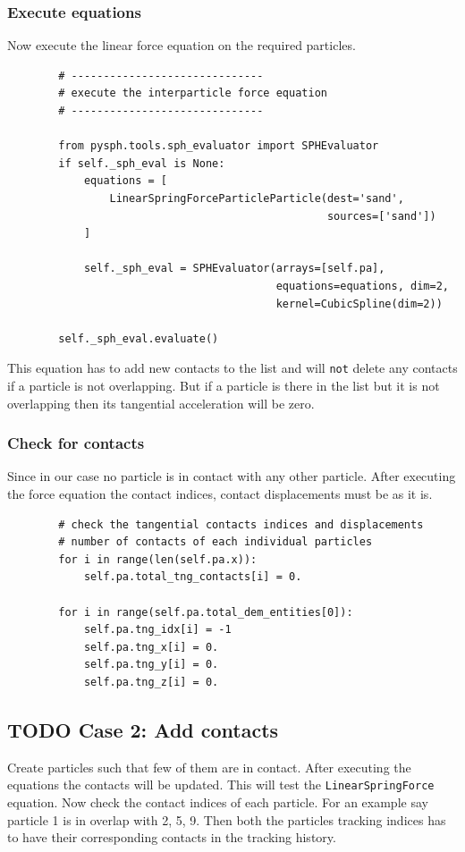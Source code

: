 \documentclass[11pt]{article}
\begin{document}
\subsubsection{Execute equations}
\label{sec:orgbbfcea2}
Now execute the linear force equation on the required particles.
\begin{verbatim}
        # ------------------------------
        # execute the interparticle force equation
        # ------------------------------

        from pysph.tools.sph_evaluator import SPHEvaluator
        if self._sph_eval is None:
            equations = [
                LinearSpringForceParticleParticle(dest='sand',
                                                  sources=['sand'])
            ]

            self._sph_eval = SPHEvaluator(arrays=[self.pa],
                                          equations=equations, dim=2,
                                          kernel=CubicSpline(dim=2))

        self._sph_eval.evaluate()
\end{verbatim}
This equation has to add new contacts to the list and will \texttt{not} delete any
contacts if a particle is not overlapping. But if a particle is there in the
list but it is not overlapping then its tangential acceleration will be
zero.

\subsubsection{Check for contacts}
\label{sec:org83d8159}
Since in our case no particle is in contact with any other particle. After
executing the force equation the contact indices, contact displacements must
be as it is.

\begin{verbatim}
        # check the tangential contacts indices and displacements
        # number of contacts of each individual particles
        for i in range(len(self.pa.x)):
            self.pa.total_tng_contacts[i] = 0.

        for i in range(self.pa.total_dem_entities[0]):
            self.pa.tng_idx[i] = -1
            self.pa.tng_x[i] = 0.
            self.pa.tng_y[i] = 0.
            self.pa.tng_z[i] = 0.
\end{verbatim}



\subsection{{\bfseries\sffamily TODO} Case 2: Add contacts}
\label{sec:orgb59afd7}
Create particles such that few of them are in contact. After executing the
equations the contacts will be updated. This will test the
\texttt{LinearSpringForce} equation. Now check the contact indices of each
particle. For an example say particle 1 is in overlap with 2, 5, 9. Then both
the particles tracking indices has to have their corresponding contacts in
the tracking history.
\end{document}

